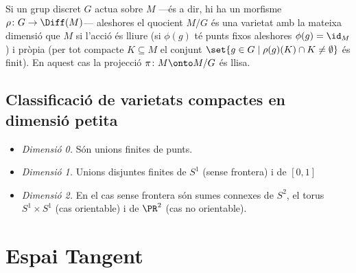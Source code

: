 \documentclass[12pt,twocolumn]{article}
\begin{document}
\begin{definition}
	Si un grup discret \( G \) actua sobre \( M \) ---és a dir, hi ha un morfisme \( \rho
	\colon G \to \Diff(M) \)--- aleshores el quocient \( M/G \) és una varietat amb la
	mateixa dimensió que \( M \) si l'acció és lliure (si \( \phi(g) \) té punts fixos
	aleshores \( \phi(g) = \id_M \)) i pròpia (per tot compacte \( K \subseteq M \) el
	conjunt \( \set{g \in G \mid \rho(g)(K) \cap K \neq \emptyset} \) és finit). En aquest
	cas la projecció \( \pi \colon M \onto M/G \) és llisa.
\end{definition}

\subsection{Classificació de varietats compactes en dimensió petita}
\begin{itemize}
	\item \emph{Dimensió 0.} Són unions finites de punts.
	\item \emph{Dimensió 1.} Unions disjuntes finites de \( S^1 \) (sense frontera) i de \(
		[0,1] \)
	\item \emph{Dimensió 2.} En el cas sense frontera són sumes connexes de \( S^2 \), el
		torus \( S^1 \times S^1 \) (cas orientable) i de \( \PR^2 \) (cas no orientable).
\end{itemize}

\section{Espai Tangent}
\end{document}
